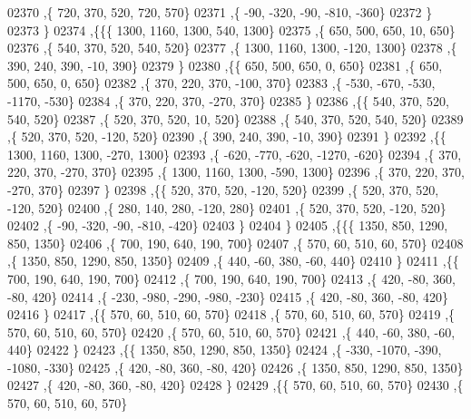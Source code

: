 \begin{DoxyCode}
02370     ,\{   720,   370,   520,   720,   570\}
02371     ,\{   -90,  -320,   -90,  -810,  -360\}
02372     \}
02373    \}
02374   ,\{\{\{  1300,  1160,  1300,   540,  1300\}
02375     ,\{   650,   500,   650,    10,   650\}
02376     ,\{   540,   370,   520,   540,   520\}
02377     ,\{  1300,  1160,  1300,  -120,  1300\}
02378     ,\{   390,   240,   390,   -10,   390\}
02379     \}
02380    ,\{\{   650,   500,   650,     0,   650\}
02381     ,\{   650,   500,   650,     0,   650\}
02382     ,\{   370,   220,   370,  -100,   370\}
02383     ,\{  -530,  -670,  -530, -1170,  -530\}
02384     ,\{   370,   220,   370,  -270,   370\}
02385     \}
02386    ,\{\{   540,   370,   520,   540,   520\}
02387     ,\{   520,   370,   520,    10,   520\}
02388     ,\{   540,   370,   520,   540,   520\}
02389     ,\{   520,   370,   520,  -120,   520\}
02390     ,\{   390,   240,   390,   -10,   390\}
02391     \}
02392    ,\{\{  1300,  1160,  1300,  -270,  1300\}
02393     ,\{  -620,  -770,  -620, -1270,  -620\}
02394     ,\{   370,   220,   370,  -270,   370\}
02395     ,\{  1300,  1160,  1300,  -590,  1300\}
02396     ,\{   370,   220,   370,  -270,   370\}
02397     \}
02398    ,\{\{   520,   370,   520,  -120,   520\}
02399     ,\{   520,   370,   520,  -120,   520\}
02400     ,\{   280,   140,   280,  -120,   280\}
02401     ,\{   520,   370,   520,  -120,   520\}
02402     ,\{   -90,  -320,   -90,  -810,  -420\}
02403     \}
02404    \}
02405   ,\{\{\{  1350,   850,  1290,   850,  1350\}
02406     ,\{   700,   190,   640,   190,   700\}
02407     ,\{   570,    60,   510,    60,   570\}
02408     ,\{  1350,   850,  1290,   850,  1350\}
02409     ,\{   440,   -60,   380,   -60,   440\}
02410     \}
02411    ,\{\{   700,   190,   640,   190,   700\}
02412     ,\{   700,   190,   640,   190,   700\}
02413     ,\{   420,   -80,   360,   -80,   420\}
02414     ,\{  -230,  -980,  -290,  -980,  -230\}
02415     ,\{   420,   -80,   360,   -80,   420\}
02416     \}
02417    ,\{\{   570,    60,   510,    60,   570\}
02418     ,\{   570,    60,   510,    60,   570\}
02419     ,\{   570,    60,   510,    60,   570\}
02420     ,\{   570,    60,   510,    60,   570\}
02421     ,\{   440,   -60,   380,   -60,   440\}
02422     \}
02423    ,\{\{  1350,   850,  1290,   850,  1350\}
02424     ,\{  -330, -1070,  -390, -1080,  -330\}
02425     ,\{   420,   -80,   360,   -80,   420\}
02426     ,\{  1350,   850,  1290,   850,  1350\}
02427     ,\{   420,   -80,   360,   -80,   420\}
02428     \}
02429    ,\{\{   570,    60,   510,    60,   570\}
02430     ,\{   570,    60,   510,    60,   570\}

\end{DoxyCode}
